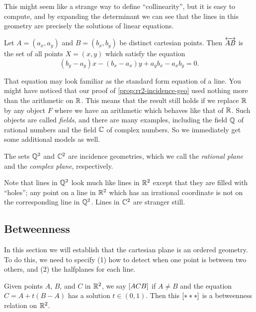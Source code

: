 This might seem like a strange way to define ``collinearity'', but it is easy to compute, and by expanding the determinant we can see that the lines in this geometry are precisely the solutions of linear equations.

\begin{cor}[Lines in \(\RR^2\)]\label{cor:cartesian-lines}
Let \(A = (a_x, a_y)\) and \(B = (b_x, b_y)\) be distinct cartesian points.
Then \(\overleftrightarrow{AB}\) is the set of all points \(X = (x,y)\) which satisfy the equation \[ (b_y-a_y)x - (b_x-a_x)y + a_yb_x - a_xb_y = 0. \]
\end{cor}

That equation may look familiar as the standard form equation of a line.
You might have noticed that our proof of \ref{prop:rr2-incidence-geo} used nothing more than the arithmetic on \(\mathbb{R}\).
This means that the result still holds if we replace \(\mathbb{R}\) by any object \(F\) where we have an arithmetic which behaves like that of \(\mathbb{R}\).
Such objects are called \emph{fields}, and there are many examples, including the field \(\mathbb{Q}\) of rational numbers and the field \(\mathbb{C}\) of complex numbers.
So we immediately get some additional models as well.

\begin{cor}
The sets \(\mathbb{Q}^2\) and \(\mathbb{C}^2\) are incidence geometries, which we call the \emph{rational plane} and the \emph{complex plane}, respectively.
\end{cor}

Note that lines in \(\mathbb{Q}^2\) look much like lines in \(\RR^2\) except that they are filled with ``holes''; any point on a line in \(\RR^2\) which has an irrational coordinate is not on the corresponding line in \(\mathbb{Q}^2\).
Lines in \(\mathbb{C}^2\) are stranger still.

\subsection*{Betweenness}

In this section we will establish that the cartesian plane is an ordered geometry.
To do this, we need to specify (1) how to detect when one point is between two others, and (2) the halfplanes for each line.

\begin{prop}\label{prop:rr2-between}
Given points \(A\), \(B\), and \(C\) in \(\RR^2\), we say \([ A C B ]\) if \(A \neq B\) and the equation \(C = A + t(B-A)\) has a solution \(t \in (0,1)\).
Then this \([ \ast \ast \ast ]\) is a betweenness relation on \(\RR^2\).
\end{prop}


